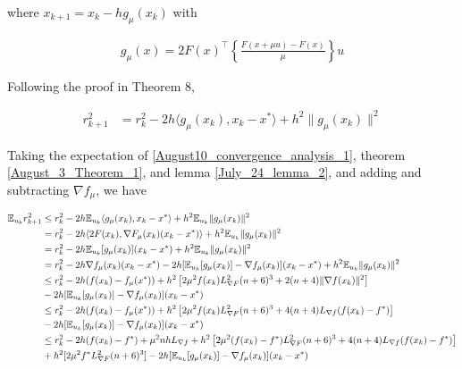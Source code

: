 \documentclass{article}
\begin{document}
where $x_{k+1} = x_k - hg_{\mu}(x_k)$ with

\begin{align*}
g_{\mu}(x) = 2F(x)^\top\left\{\frac{F(x+\mu u)-F(x)}{\mu}\right\}u
\end{align*}

Following the proof in Theorem $8$, 

\begin{align}
r_{k+1}^2 & = r_k^2 - 2h\langle g_{\mu}(x_k), x_k - x^* \rangle + h^2\|g_{\mu}(x_k)\|^2 \label{August10_convergence_analysis_1}
\end{align}

Taking the expectation of \eqref{August10_convergence_analysis_1}, theorem \ref{August_3_Theorem_1}, and lemma \ref{July_24_lemma_2}, and adding and subtracting $\nabla f_{\mu}$, we have 

\begin{align}
\mathbb{E}_{u_k}r_{k+1}^2 & \leq r_k^2 - 2h\mathbb{E}_{u_k}\langle g_{\mu}(x_k), x_k - x^*\rangle + h^2\mathbb{E}_{u_k}\|g_{\mu}(x_k)\|^2 \notag \\ & = r_k^2 - 2h\langle 2F(x_k),\nabla F_{\mu}(x_k)(x_k - x^*)\rangle + h^2\mathbb{E}_{u_k}\|g_{\mu}(x_k)\|^2 \notag \\ & = r_k^2 - 2h\mathbb{E}_{u_k}[g_{\mu}(x_k)](x_k-x^*) + h^2\mathbb{E}_{u_k}\|g_{\mu}(x_k)\|^2 \notag \\ & = r_k^2 - 2h\nabla f_{\mu}(x_k)(x_k - x^*) -2h[\mathbb{E}_{u_k}[g_{\mu}(x_k)] - \nabla f_{\mu}(x_k)](x_k-x^*) + h^2\mathbb{E}_{u_k}\|g_{\mu}(x_k)\|^2 \notag \\ & \leq r_k^2 - 2h(f(x_k)-f_{\mu}(x^*)) + h^2\left[2\mu^2f(x_k)L_{\nabla F}^2(n+6)^3 + 2(n+4)\|\nabla f(x_k)\|^2\right] \notag \\ & - 2h[\mathbb{E}_{u_k}[g_{\mu}(x_k)] - \nabla f_{\mu}(x_k)](x_k-x^*) \notag \\ & \leq r_k^2 - 2h(f(x_k) - f_{\mu}(x^*)) + h^2\left[2\mu^2 f(x_k)L_{\nabla F}^2(n+6)^3 + 4(n+4)L_{\nabla f}(f(x_k)-f^*)\right] \notag \\ & - 2h[\mathbb{E}_{u_k}[g_{\mu}(x_k)] - \nabla f_{\mu}(x_k)](x_k-x^*) \notag \\ & \leq r_k^2 - 2h(f(x_k) - f^*) + \mu^2nhL_{\nabla f} + h^2\left[2\mu^2(f(x_k)-f^*) L_{\nabla F}^2(n+6)^3 + 4(n+4)L_{\nabla f}(f(x_k)-f^*)\right] \notag \\ & + h^2[2\mu^2 f^*L_{\nabla F}^2(n+6)^3] -2h[\mathbb{E}_{u_k}[g_{\mu}(x_k)]-\nabla f_{\mu}(x_k)](x_k-x^*) \label{August10_convergence_analysis_2}
\end{align} 
\end{document}

